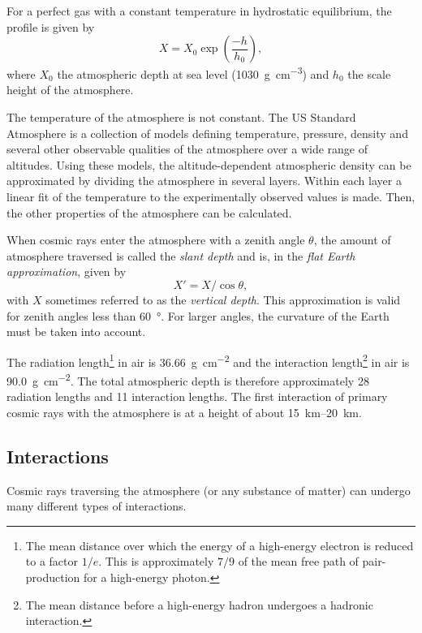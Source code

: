 For a perfect gas with a constant temperature in hydrostatic equilibrium, the
profile is given by \cite[122]{Stanev:2004}
\begin{equation}
X = X_0 \exp\left(\frac{-h}{h_0}\right),
\end{equation}
where $X_0$ the atmospheric depth at sea level
(\SI{1030}{\gram\per\centi\meter\cubed}) and $h_0$ the scale height of the
atmosphere.

The temperature of the atmosphere is not constant.  The US Standard Atmosphere
\cite{atmosphere:1976} is a collection of models defining temperature, pressure,
density and several other observable qualities of the atmosphere over a wide range of
altitudes. Using these models, the altitude-dependent atmospheric density can be
approximated by dividing the atmosphere in several layers. Within each layer a
linear fit of the temperature to the experimentally observed values is made.
Then, the other properties of the atmosphere can be calculated.

When cosmic rays enter the atmosphere with a zenith angle $\theta$, the amount
of atmosphere traversed is called the \emph{slant depth} and is, in the
\emph{flat Earth approximation}, given by
\begin{equation}
X' = X / \cos\theta,
\end{equation}
with $X$ sometimes referred to as the \emph{vertical depth}.
This approximation is valid for zenith angles less than \SI{60}{\degree}. For
larger angles, the curvature of the Earth must be taken into account.

The radiation length\footnote{The mean distance over which the energy of a
high-energy electron is reduced to a factor $1/e$. This is approximately $7/9$
of the mean free path of pair-production for a high-energy photon.} in air is
\SI{36.66}{\gram\per\centi\meter\squared} and the interaction
length\footnote{The mean distance before a high-energy hadron
undergoes a hadronic interaction.} in air is
\SI{90.0}{\gram\per\centi\meter\squared}.
The total atmospheric depth is therefore approximately 28 radiation lengths and
11 interaction lengths.  The first interaction of primary cosmic rays with the
atmosphere is at a height of about \SIrange{15}{20}{\kilo\meter}.


\subsection{Interactions}

Cosmic rays traversing the atmosphere (or any substance of matter) can undergo
many different types of interactions.

